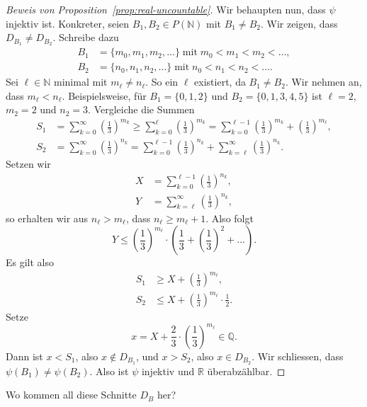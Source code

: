 \documentclass[../main.tex]{subfiles}
\begin{document}
\begin{proof}[Beweis von Proposition~\ref{prop:real-uncountable}]
Wir behaupten nun, dass $\psi$ injektiv ist. Konkreter, seien
$B_{1}, B_{2} \in P(\mathbb N)$ mit $B_{1} \neq B_{2}$.
Wir zeigen, dass $D_{B_{1}} \neq D_{B_{2}}$.
Schreibe dazu
\begin{align*}
  B_{1} &= \{m_{0}, m_{1}, m_{2}, \dots\} \;\text{mit}\; m_{0} < m_{1} < m_{2} < \dots, \\
  B_{2} &= \{n_{0}, n_{1}, n_{2}, \dots\} \;\text{mit}\; n_{0} < n_{1} < n_{2} < \dots.
\end{align*}
Sei $\ell \in \mathbb N$ minimal mit $m_{\ell} \neq n_{\ell}$. So ein $\ell$
existiert, da $B_{1} \neq B_{2}$. Wir nehmen an, dass $m_{\ell} < n_{\ell}$.
Beispielsweise, für $B_{1} = \{0, 1, 2\}$ und $B_{2} = \{0, 1, 3, 4, 5\}$ ist
$\ell = 2$, $m_{2} = 2$ und $n_{2} = 3$.
Vergleiche die Summen
\begin{align*}
  S_{1} &= \sum_{k=0}^{\infty} {\left(\frac{1}{3}\right)}^{m_{k}}
          \geq \sum_{k=0}^{\ell} {\left(\frac{1}{3}\right)}^{m_{k}}
          = \sum_{k=0}^{\ell-1} {\left(\frac{1}{3}\right)}^{m_{k}} + {\left(\frac{1}{3}\right)}^{m_{\ell}}, \\
  S_{2} &= \sum_{k=0}^{\infty}{\left(\frac{1}{3}\right)}^{n_{k}}
          = \sum_{k=0}^{\ell - 1} {\left(\frac{1}{3}\right)}^{n_{k}}
          + \sum_{k= \ell}^{\infty} {\left(\frac{1}{3}\right)}^{n_{k}}.
\end{align*}
Setzen wir
\begin{align*}
  X &= \sum_{k=0}^{\ell - 1}{\left(\frac{1}{3}\right)}^{n_{k}}, \\
  Y &= \sum_{k= \ell}^{\infty} {\left(\frac{1}{3}\right)}^{n_{k}},
\end{align*}
so erhalten wir aus $n_{\ell} > m_{\ell}$, dass $n_{\ell} \geq m_{\ell} + 1$.
Also folgt
\[Y \leq {\left(\frac{1}{3}\right)}^{m_{\ell}} \cdot \left(
    \frac{1}{3} + {\left( \frac{1}{3}\right)}^{2} + \dots
    \right).\]
Es gilt also
\begin{align*}
  S_{1} & \geq X + {\left(\frac{1}{3}\right)}^{m_{\ell}}, \\
  S_{2} & \leq X + {\left(\frac{1}{3}\right)}^{m_{\ell}}\cdot \frac{1}{2}.
\end{align*}
Setze
\[x = X + \frac{2}{3}\cdot {\left(\frac{1}{3}\right)}^{m_{\ell}} \in \mathbb Q.\]
Dann ist $x < S_{1}$, also $x \notin D_{B_{1}}$, und $x > S_{2}$, also
$x \in D_{B_{2}}$. Wir schliessen, dass $\psi(B_{1}) \neq \psi(B_{2})$.
Also ist $\psi$ injektiv und $\mathbb R$ überabzählbar.
\end{proof}

\begin{question}
  Wo kommen all diese Schnitte $D_{B}$ her?
\end{question}
\end{document}
